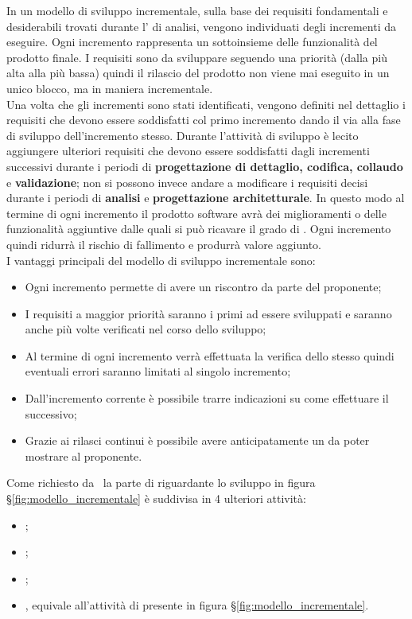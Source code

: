 In un modello di sviluppo incrementale, sulla base dei requisiti fondamentali e desiderabili trovati durante l' di analisi, vengono individuati degli incrementi da eseguire. Ogni incremento rappresenta un sottoinsieme delle funzionalità del prodotto finale. I requisiti sono da sviluppare seguendo una priorità (dalla più alta alla più bassa) quindi il rilascio del prodotto non viene mai eseguito in un unico blocco, ma in maniera incrementale.\\
Una volta che gli incrementi sono stati identificati, vengono definiti nel dettaglio i requisiti che devono essere soddisfatti col primo incremento dando il via alla fase di sviluppo dell'incremento stesso. Durante l’attività di sviluppo è lecito aggiungere ulteriori requisiti che devono essere soddisfatti dagli incrementi successivi durante i periodi di \textbf{progettazione di dettaglio, codifica, collaudo} e \textbf{validazione}; non si possono invece andare a modificare i requisiti decisi durante i periodi di \textbf{analisi} e \textbf{progettazione architetturale}. In questo modo al termine di ogni incremento il prodotto software avrà dei miglioramenti o delle funzionalità aggiuntive dalle quali si può ricavare il grado di . Ogni incremento quindi ridurrà il rischio di fallimento e produrrà valore aggiunto.\\
I vantaggi principali del modello di sviluppo incrementale sono:
\begin{itemize}
    \item Ogni incremento permette di avere un riscontro da parte del proponente;
    \item I requisiti a maggior priorità saranno i primi ad essere sviluppati e saranno anche più volte verificati nel corso dello sviluppo;
    \item Al termine di ogni incremento verrà effettuata la verifica dello stesso quindi eventuali errori saranno limitati al singolo incremento;
    \item Dall'incremento corrente è possibile trarre indicazioni su come effettuare il successivo;
    \item Grazie ai rilasci continui è possibile avere anticipatamente un  da poter mostrare al proponente.
\end{itemize}

Come richiesto da \Proponente\ la parte di  riguardante lo sviluppo in figura \S\ref{fig:modello_incrementale} è suddivisa in 4 ulteriori attività:
\begin{itemize}
    \item {};
    \item {};
    \item {};
    \item {}, equivale all'attività di  presente in figura \S\ref{fig:modello_incrementale}.
\end{itemize}